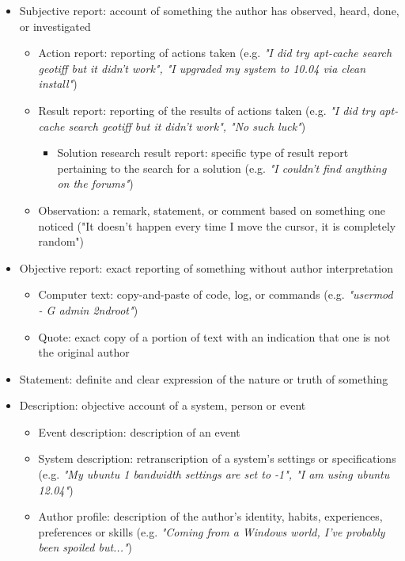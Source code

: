 \documentclass[11pt]{article}
\begin{document}
\begin{itemize}
	\item Subjective report: account of something the author has observed, heard, done, or investigated
		\begin{itemize}
			\item Action report: reporting of actions taken (e.g. \textit{"I did try apt-cache search geotiff but it didn't work", "I upgraded my system to 10.04 via clean install"})
			\item Result report: reporting of the results of actions taken (e.g. \textit{"I did try apt-cache search geotiff but it didn't work", "No such luck"})
				\begin{itemize}
					\item Solution research result report: specific type of result report pertaining to the search for a solution (e.g. \textit{"I couldn't find anything on the forums"})
				\end{itemize}
			\item Observation: a remark, statement, or comment based on something one noticed ("It doesn't happen every time I move the cursor, it is completely random")
		\end{itemize}
	\item Objective report: exact reporting of something without author interpretation
		\begin{itemize}
			\item Computer text: copy-and-paste of code, log, or commands (e.g. \textit{"usermod - G admin 2ndroot"})
			\item Quote: exact copy of a portion of text with an indication that one is not the original author
		\end{itemize}
	\item Statement: definite and clear expression of the nature or truth of something
	\item Description: objective account of a system, person or event
		\begin{itemize}
			\item Event description: description of an event
			\item System description: retranscription of a system's settings or specifications (e.g. \textit{"My ubuntu 1 bandwidth settings are set to -1", "I am using ubuntu 12.04"})
			\item Author profile: description of the author's identity, habits, experiences, preferences or skills (e.g. \textit{"Coming from a Windows world, I've probably been spoiled but..."})

\end{itemize}
\end{itemize}
\end{document}
